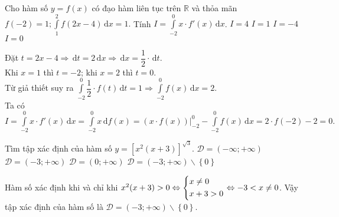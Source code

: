 \begin{ex}%
	Cho hàm số $y=f(x)$ có đạo hàm liên tục trên $\mathbb{R}$ và thỏa mãn $f(-2)=1; \displaystyle\int\limits_1^2 f(2x-4)\mathrm{\,d}x =1.$ Tính $I= \displaystyle\int\limits_{-2}^0 x\cdot f'(x)\mathrm{\,d}x$.
	\choice
	{$I=4$}
	{$I=1$}
	{$I=-4$}
	{\True $I=0$}
	\loigiai
	{ Đặt $t=2x-4 \Rightarrow \mathrm{\,d}t= 2 \mathrm{\,d}x \Rightarrow \mathrm{\,d}x = \dfrac{1}{2} \cdot \mathrm{\,d}t$.\\
		Khi $x=1$ thì $t=-2$; khi $x=2$ thì $t=0$.\\
		Từ giả thiết suy ra $\displaystyle\int\limits_{-2}^0 \dfrac{1}{2}\cdot f(t)\mathrm{\,d}t =1 \Rightarrow \displaystyle\int\limits_{-2}^0 f(x)\mathrm{\,d}x =2.$\\
		Ta có  $I= \displaystyle\int\limits_{-2}^0 x\cdot f'(x)\mathrm{\,d}x =\displaystyle\int\limits_{-2}^0 x\mathrm{\,d}f(x) = \left( x \cdot f(x)\right) \Bigr\rvert_{-2}^0 -\displaystyle\int\limits_{-2}^0 f(x)\mathrm{\,d}x = 2\cdot f(-2) -2 = 0.$
		
	}
\end{ex}

\begin{ex}%
	Tìm tập xác định của hàm số $y=\left[ x^2(x+3)\right]^{\sqrt{3}}$.
	\choice
	{$\mathscr{D}=(-\infty;+\infty)$}
	{$\mathscr{D}=(-3;+\infty)$}
	{$\mathscr{D}=(0;+\infty)$}
	{\True $\mathscr{D}=(-3;+\infty) \backslash \left\{ 0\right\}$}
	\loigiai
	{ Hàm số xác định khi và chỉ khi $x^2(x+3) >0 \Leftrightarrow \left\{\begin{aligned}&x \neq 0\\& x+3>0 \end{aligned}\right. \Leftrightarrow -3<x \neq 0 $. Vậy tập xác định của hàm số là $\mathscr{D}=(-3;+\infty) \backslash \left\{ 0\right\}$.
		
	}
	
\end{ex}

